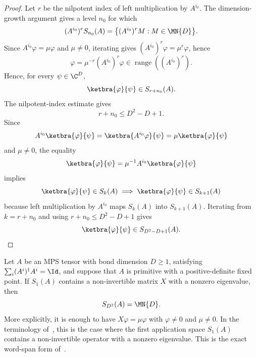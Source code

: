 \begin{proof}
    \leanok
    Let $r$ be the nilpotent index of left multiplication by $A^{i_0}$.
    The dimension-growth argument gives a level $n_0$ for which
    \[
        (A^{i_0})^r S_{n_0}(A)
        =
        \bigl\{(A^{i_0})^r M : M\in \MN{D}\bigr\}.
    \]
    Since $A^{i_0}\varphi=\mu\varphi$ and $\mu\neq 0$, iterating gives
    $(A^{i_0})^r\varphi=\mu^r\varphi$, hence
    \[
        \varphi
        =
        \mu^{-r}(A^{i_0})^r\varphi
        \in \operatorname{range}((A^{i_0})^r).
    \]
    Hence, for every $\psi\in\C^D$,
    \[
        \ketbra{\varphi}{\psi}\in S_{r+n_0}(A).
    \]
    The nilpotent-index estimate gives
    \[
        r+n_0\le D^2-D+1.
    \]
    Since
    \[
        A^{i_0}\ketbra{\varphi}{\psi}
        =
        \ketbra{A^{i_0}\varphi}{\psi}
        =
        \mu\ketbra{\varphi}{\psi}
    \]
    and $\mu\neq 0$, the equality
    \[
        \ketbra{\varphi}{\psi}
        =
        \mu^{-1}A^{i_0}\ketbra{\varphi}{\psi}
    \]
    implies
    \[
        \ketbra{\varphi}{\psi}\in S_k(A)
        \implies
        \ketbra{\varphi}{\psi}\in S_{k+1}(A)
    \]
    because left multiplication by $A^{i_0}$ maps $S_k(A)$ into
    $S_{k+1}(A)$.  Iterating from $k=r+n_0$ and using
    $r+n_0\le D^2-D+1$ gives
    \[
        \ketbra{\varphi}{\psi}\in S_{D^2-D+1}(A).
    \]
\end{proof}

\begin{theorem}%
    \label{thm:wielandt_case3_one_step_span}
    \leanok
    Let $A$ be an MPS tensor with bond dimension $D \ge 1$, satisfying
    $\sum_i (A^i)^\dagger A^i=\Id$, and suppose that $A$ is primitive
    with a positive-definite fixed point. If $S_1(A)$ contains a
    non-invertible matrix $X$ with a nonzero eigenvalue, then
    \[
        S_{D^2}(A)=\MN{D}.
    \]
    More explicitly, it is enough to have $X\varphi=\mu\varphi$ with
    $\varphi \ne 0$ and $\mu \ne 0$. In the terminology of~\cite{Sanz2010Quantum},
    this is the case where the first application space $S_1(A)$ contains a
    non-invertible operator with a nonzero eigenvalue. This is the exact
    word-span form of~\cite[Theorem~1, case~(3)]{Sanz2010Quantum}.
\end{theorem}

